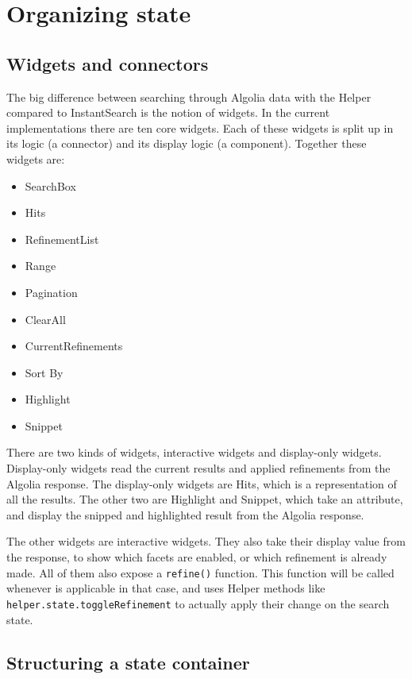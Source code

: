 
\section{Organizing state} %
\label{sec:organizing_state}

\subsection{Widgets and connectors}
\label{sub:widgets_and_connectors}

The big difference between searching through Algolia data with the Helper compared to InstantSearch is the notion of widgets. In the current implementations there are ten core widgets. Each of these widgets is split up in its logic (a connector) and its display logic (a component). Together these widgets are:

\begin{itemize}
  \item SearchBox
  \item Hits
  \item RefinementList
  \item Range
  \item Pagination
  \item ClearAll
  \item CurrentRefinements
  \item Sort By
  \item Highlight
  \item Snippet
\end{itemize}

There are two kinds of widgets, interactive widgets and display-only widgets. Display-only widgets read the current results and applied \glspl{refinement} from the Algolia response. The display-only widgets are Hits, which is a representation of all the results. The other two are Highlight and Snippet, which take an attribute, and display the snipped and highlighted result from the Algolia response.

The other widgets are interactive widgets. They also take their display value from the response, to show which facets are enabled, or which \gls{refinement} is already made. All of them also expose a {\tt refine()} function. This function will be called whenever is applicable in that case, and uses Helper methods like {\tt helper.state.toggleRefinement} to actually apply their change on the search state.

\subsection{Structuring a state container}
\label{sub:structuring_a_state_container}

